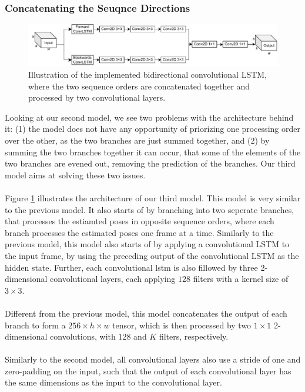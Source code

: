 \documentclass[./main.tex]{subfiles}
\begin{document}
\subsubsection{Concatenating the Seuqnce Directions}
\begin{figure}[htbp]
    \centering
    \includegraphics[width=\textwidth]{./entities/unipose2.pdf}
    \caption{Illustration of the implemented bidirectional convolutional LSTM, where the two sequence orders are concatenated together and processed by two convolutional layers.}
    \label{fig:unipose2}
\end{figure}

Looking at our second model, we see two problems with the architecture behind it: (1) the model does not have any opportunity of priorizing one processing order over the other, as the two branches are just summed together, and (2) by summing the two branches together it can occur, that some of the elements of the two branches are evened out, removing the prediction of the branches. Our third model aims at solving these two issues.
\\
\\
Figure \ref{fig:unipose2} illustrates the architecture of our third model. This model is very similar to the previous model. It also starts of by branching into two seperate branches, that processes the estiamted poses in opposite sequence orders, where each branch processes the estimated poses one frame at a time. Similarly to the previous model, this model also starts of by applying a convolutional LSTM to the input frame, by using the preceding output of the convolutional LSTM as the hidden state. Further, each convolutional lstm is also fillowed by three 2-dimensional convolutional layers, each applying $128$ filters with a kernel size of $3 \times 3$. 
\\
\\
Different from the previous model, this model concatenates the output of each branch to form a $256 \times h \times w$ tensor, which is then processed by two $1 \times 1$ 2-dimensional convolutions, with $128$ and $K$ filters, respectively.
\\
\\
Similarly to the second model, all convolutional layers also use a stride of one and zero-padding on the input, such that the output of each convolutional layer has the same dimensions as the input to the convolutional layer.
\end{document}
